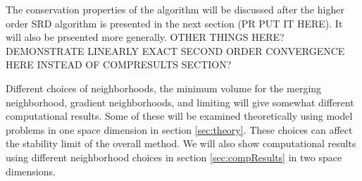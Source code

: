The conservation properties of the algorithm will be discussed after the
higher order SRD algorithm is presented in the next
section (PR PUT IT HERE). It will also be prseented more generally.   
OTHER THINGS HERE? DEMONSTRATE LINEARLY EXACT SECOND ORDER CONVERGENCE
HERE INSTEAD OF COMPRESULTS SECTION?

Different choices of neighborhoods, the minimum volume for the merging
neighborhood, gradient neighborhoods, and limiting will give
somewhat different computational results. Some of these will be examined
theoretically using model problems in one space dimension in section
\ref{sec:theory}. These choices can affect the stability limit of the
overall method.
We will also show computational results using different neighborhood
choices in section \ref{sec:compResults} in two space dimensions.


